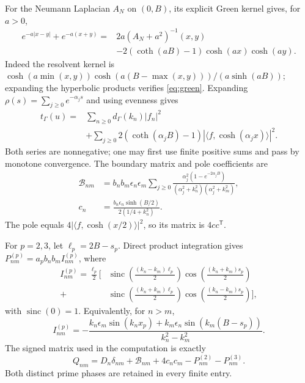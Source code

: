 \documentclass[11pt]{article}
\newcommand{\ip}[2]{\langle#1,#2\rangle}
\begin{document}
For the Neumann Laplacian $A_N$ on $(0,B)$, its explicit Green kernel gives, for $a>0$,
\begin{align}
 e^{-a|x-y|}+e^{-a(x+y)}
 ={}&2a(A_N+a^2)^{-1}(x,y)\nonumber\\[-2pt]
 &-2(\coth(aB)-1)\cosh(ax)\cosh(ay).\label{eq:green}
\end{align}
Indeed the resolvent kernel is
$\cosh(a\min(x,y))\cosh(a(B-\max(x,y)))/(a\sinh(aB))$;
expanding the hyperbolic products verifies \eqref{eq:green}.
Expanding $\rho(s)=\sum_{j\ge0}e^{-\alpha_js}$ and using evenness gives
\begin{align}
 t_\Gamma(u)={}&\sum_{n\ge0}d_\Gamma(k_n)|f_n|^2\nonumber\\
 &+\sum_{j\ge0}2(\coth(\alpha_jB)-1)
             |\ip f{\cosh(\alpha_jx)}|^2.\label{eq:neumann}
\end{align}
Both series are nonnegative; one may first use finite positive sums and pass by monotone convergence. The boundary matrix and pole coefficients are
\begin{align}
 \mathcal B_{nm}&=b_nb_m\epsilon_n\epsilon_m
 \sum_{j\ge0}\frac{\alpha_j^2(1-e^{-2\alpha_jB})}
 { (\alpha_j^2+k_n^2)(\alpha_j^2+k_m^2)},\label{eq:boundary}\\
 c_n&=\frac{b_n\epsilon_n\sinh(B/2)}{2(1/4+k_n^2)}.
\end{align}
The pole equals $4|\ip f{\cosh(x/2)}|^2$, so its matrix is $4cc^{\mathsf T}$.

For $p=2,3$, let $\ell_p=2B-s_p$. Direct product integration gives $P^{(p)}_{nm}=a_pb_nb_m I^{(p)}_{nm}$, where
\begin{align}
 I^{(p)}_{nm}=\frac{\ell_p}{2}\bigg[&
 \operatorname{sinc}\!\left(\frac{(k_n-k_m)\ell_p}{2}\right)
 \cos\!\left(\frac{(k_n+k_m)s_p}{2}\right)\nonumber\\
 +&\operatorname{sinc}\!\left(\frac{(k_n+k_m)\ell_p}{2}\right)
 \cos\!\left(\frac{(k_n-k_m)s_p}{2}\right)\bigg],\label{eq:prime}
\end{align}
with $\operatorname{sinc}(0)=1$. Equivalently, for $n>m$,
\[
 I^{(p)}_{nm}=-\frac{k_n\epsilon_m\sin(k_nx_p)
              +k_m\epsilon_n\sin(k_m(B-s_p))}{k_n^2-k_m^2}.
\]
The signed matrix used in the computation is exactly
\begin{equation}
 Q_{nm}=D_n\delta_{nm}+\mathcal B_{nm}+4c_nc_m-P^{(2)}_{nm}-P^{(3)}_{nm}.
 \label{eq:Q}
\end{equation}
Both distinct prime phases are retained in every finite entry.
\end{document}
